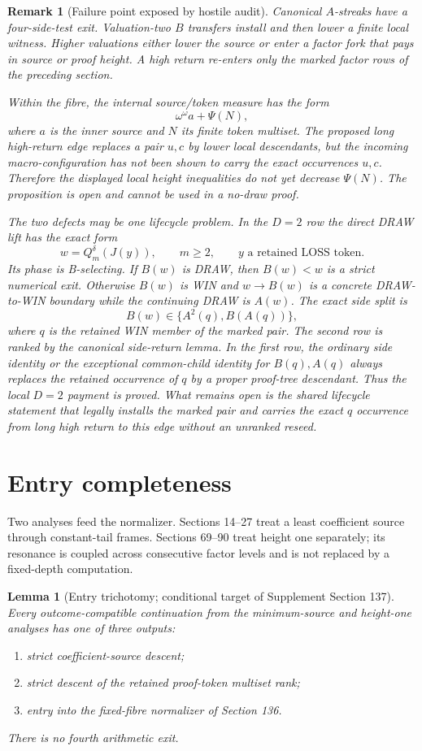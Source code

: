 \documentclass[11pt]{article}
\newtheorem{lemma}[theorem]{Lemma}
\newtheorem{remark}[theorem]{Remark}
\begin{document}
\begin{remark}[Failure point exposed by hostile audit]
Canonical $A$-streaks have a four-side-test exit. Valuation-two $B$ transfers
install and then lower a finite local witness. Higher valuations either lower
the source or enter a factor fork that pays in source or proof height. A high
return re-enters only the marked factor rows of the preceding section.

Within the fibre, the internal source/token measure has the form
\[
  \omega^\omega a+\Psi(N),
\]
where $a$ is the inner source and $N$ its finite token multiset. The proposed
long high-return edge replaces a pair $u,c$ by lower local descendants, but
the incoming macro-configuration has not been shown to carry the exact
occurrences $u,c$. Therefore the displayed local height inequalities do not
yet decrease $\Psi(N)$. The proposition is open and cannot be used in a
no-draw proof.

The two defects may be one lifecycle problem. In the $D=2$ row the direct
DRAW lift has the exact form
\[
 w=Q_m^\delta(J(y)),\qquad m\ge2,\qquad y\text{ a retained LOSS token}.
\]
Its phase is B-selecting. If $B(w)$ is DRAW, then $B(w)<w$ is a strict
numerical exit. Otherwise $B(w)$ is WIN and $w\to B(w)$ is a concrete
DRAW-to-WIN boundary while the continuing DRAW is $A(w)$. The exact side
split is
\[
 B(w)\in\{A^2(q),B(A(q))\},
\]
where $q$ is the retained WIN member of the marked pair. The second row is
ranked by the canonical side-return lemma. In the first row, the ordinary
side identity or the exceptional common-child identity for $B(q),A(q)$
always replaces the retained occurrence of $q$ by a proper proof-tree
descendant. Thus the local $D=2$ payment is proved. What remains open is the
shared lifecycle statement that legally installs the marked pair and carries
the exact $q$ occurrence from long high return to this edge without an
unranked reseed.
\end{remark}

\section{Entry completeness}

Two analyses feed the normalizer. Sections 14--27 treat a least coefficient
source through constant-tail frames. Sections 69--90 treat height one
separately; its resonance is coupled across consecutive factor levels and is
not replaced by a fixed-depth computation.

\begin{lemma}[Entry trichotomy; conditional target of Supplement Section 137]
Every outcome-compatible continuation from the minimum-source and height-one
analyses has one of three outputs:
\begin{enumerate}
  \item strict coefficient-source descent;
  \item strict descent of the retained proof-token multiset rank;
  \item entry into the fixed-fibre normalizer of Section 136.
\end{enumerate}
There is no fourth arithmetic exit.
\end{lemma}
\end{document}
